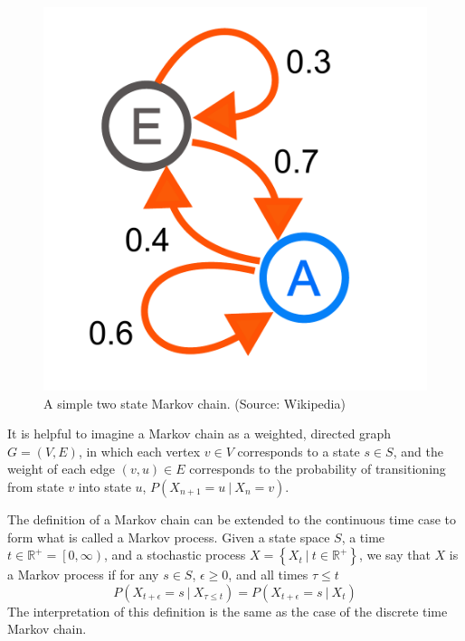 \documentclass[tog]{acmsiggraph}
\newcommand{\given}[1][]{\:#1\vert\:}
\begin{document}
\begin{figure}[h]
  \centering
  \def\svgwidth{\columnwidth}
  \includegraphics[scale=0.3]{MarkovChain.pdf}
  \caption{A simple two state Markov chain. (Source: Wikipedia)}
  \label{fig:markovChain}
\end{figure}

It is helpful to imagine a Markov chain as a weighted, directed graph $G = (V, E)$, 
in which each vertex $v \in V$ corresponds to a state $s \in S$, and the weight of 
each edge $\left(v, u \right) \in E$ corresponds to the probability of transitioning 
from state $v$ into state $u$, $P \left( X_{n+1} = u \given X_n = v \right)$.

The definition of a Markov chain can be extended to the continuous time case to form 
what is called a Markov process. Given a state space $S$, a time 
$t \in \mathbb{R}^+ = \left[ 0, \infty \right)$, and a stochastic process 
$X = \left\{ X_t \given t \in \mathbb{R}^+ \right\}$, we say that $X$ is a 
Markov process if for any $s \in S$, $\epsilon \geq 0$, and all times $\tau \leq t$
\begin{equation*}
  P \left( X_{t+\epsilon} = s \given X_{\tau \leq t} \right) = P \left( X_{t+\epsilon} = s \given X_t \right)
\end{equation*}
The interpretation of this definition is the same as the case of the discrete time Markov chain.
\end{document}
